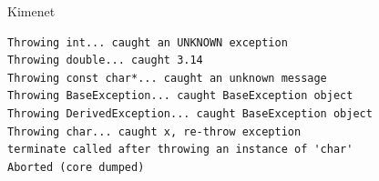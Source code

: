 \documentclass[usenames,dvipsnames,aspectratio=169]{beamer}
\begin{document}
\begin{frame}
    \begin{exampleblock}{}
        
    \end{exampleblock}
\end{frame}

\begin{frame}
    \begin{exampleblock}{}
        \small
        
    \end{exampleblock}
\end{frame}

\begin{frame}
    \begin{exampleblock}{}
        \small
        
    \end{exampleblock}
\end{frame}

\begin{frame}
    \begin{exampleblock}{}
        \small
        
    \end{exampleblock}
\end{frame}

\begin{frame}
    \begin{exampleblock}{}
        \small
        
    \end{exampleblock}
\end{frame}

\begin{frame}[fragile]
    \begin{block}{Kimenet}
        \vspace{-.3cm}
        \begin{verbatim}
Throwing int... caught an UNKNOWN exception
Throwing double... caught 3.14
Throwing const char*... caught an unknown message
Throwing BaseException... caught BaseException object
Throwing DerivedException... caught BaseException object
Throwing char... caught x, re-throw exception
terminate called after throwing an instance of 'char'
Aborted (core dumped)            
\end{verbatim}
    \vspace{-.3cm}
    \end{block}
\end{frame}
\end{document}
